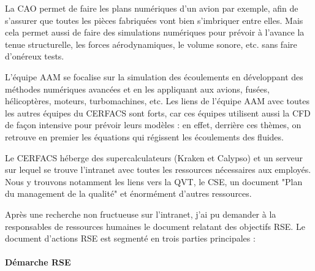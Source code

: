 \hspace{0,5cm}


La \ac{CAO} permet de faire les plans numériques d'un avion par exemple, afin de s'assurer que toutes les pièces fabriquées vont bien s'imbriquer entre elles. Mais cela permet aussi de faire des simulations numériques pour prévoir à l'avance la tenue structurelle, les forces aérodynamiques, le volume sonore, etc. sans faire d'onéreux tests.

L'équipe AAM se focalise sur la simulation des écoulements en développant des méthodes numériques avancées et en les appliquant aux avions, fusées, hélicoptères, moteurs, turbomachines, etc. Les liens de l’équipe AAM avec toutes les autres équipes du CERFACS sont forts, car ces équipes utilisent aussi la \ac{CFD} de façon intensive pour prévoir leurs modèles : en effet, derrière ces thèmes, on retrouve en premier les équations qui régissent les écoulements des fluides.

\hspace{0,5cm}

Le CERFACS héberge des supercalculateurs (Kraken et Calypso) et un serveur sur lequel se trouve l'intranet avec toutes les ressources nécessaires aux employés.
Nous y trouvons notamment les liens vers la \ac{QVT}, le \ac{CSE}, un document "Plan du management de la qualité" et énormément d'autres ressources.







\newpage

Après une recherche non fructueuse sur l'intranet, j'ai pu demander à la responsables de ressources humaines le document relatant des objectifs \ac{RSE}. Le document d'actions RSE est segmenté en trois parties principales :

\paragraph{Démarche RSE}


